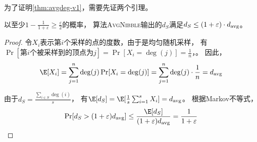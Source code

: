 为了证明\cref{thm:avgdeg-v1}，需要先证两个引理。

\begin{lemma}\label{lem:nibble-A}
    以至少$1-\frac{1}{1+\varepsilon}\ge\frac{\varepsilon}{2}$的概率，
    算法\textsc{AvgNibble}输出的$d_S$满足$d_S\le(1+\varepsilon)\cdot d_{\mathrm{avg}}$。
\end{lemma}
\begin{proof}
    令$X_i$表示第$i$个采样的点的度数，由于是均匀随机采样，
    有$\Pr[\text{第$i$个被采样到的顶点为}j]=\Pr[X_i=\deg(j)]=\frac{1}{n}$，。
    因此，
    \[
    \E[X_i]=\sum_{j=1}^n\deg(j)\Pr[X_i=\deg(j)]=\sum_{j=1}^n\deg(j)\cdot\frac{1}{n}=d_\avg
    \]

    由于$d_S=\frac{\sum_{i\in S}\deg(i)}{s}$，
    有$\E[d_S]=\E[\frac{1}{s}\sum_{i=1}^sX_i]=d_\avg$。
    根据Markov不等式，
    \[
    \Pr[d_S>(1+\varepsilon)d_\avg]\le\frac{\E[d_S]}{(1+\varepsilon)d_\avg}=\frac{1}{1+\varepsilon}
    \]
\end{proof}

